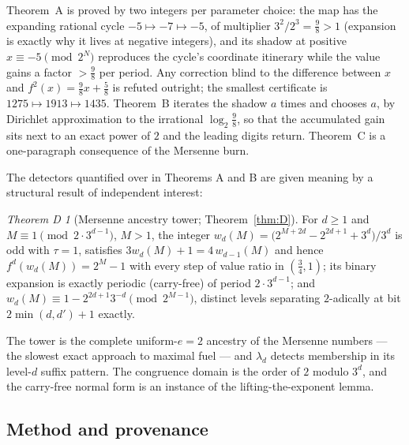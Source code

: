 \documentclass[11pt]{article}
\theoremstyle{definition}
\theoremstyle{remark}
\newtheorem*{thmD}{Theorem D}
\begin{document}
Theorem~A is proved by two integers per parameter choice: the map has
the expanding rational cycle $-5\mapsto-7\mapsto-5$, of multiplier
$3^2/2^3=\tfrac98>1$ (expansion is exactly why it lives at negative
integers), and its shadow at positive $x\equiv-5\pmod{2^N}$ reproduces
the cycle's coordinate itinerary while the value gains a factor
$>\tfrac98$ per period. Any correction blind to the difference between
$x$ and $f^2(x)=\tfrac98x+\tfrac58$ is refuted outright; the smallest
certificate is $1275\mapsto1913\mapsto1435$. Theorem~B iterates the
shadow $a$ times and chooses $a$, by Dirichlet approximation to the
irrational $\log_2\tfrac98$, so that the accumulated gain sits next to
an exact power of $2$ and the leading digits return. Theorem~C is a
one-paragraph consequence of the Mersenne burn.

The detectors quantified over in Theorems A and B are given meaning by
a structural result of independent interest:

\begin{thmD}[Mersenne ancestry tower; Theorem~\ref{thm:D}]
For $d\ge1$ and $M\equiv1\pmod{2\cdot3^{d-1}}$, $M>1$, the integer
$w_d(M)=\bigl(2^{M+2d}-2^{2d+1}+3^{d}\bigr)/3^{d}$ is odd with
$\tau=1$, satisfies $3w_d(M)+1=4\,w_{d-1}(M)$ and hence
$f^{d}(w_d(M))=2^{M}-1$ with every step of value ratio in
$(\tfrac34,1)$; its binary expansion is exactly periodic (carry-free)
of period $2\cdot3^{d-1}$; and $w_d(M)\equiv1-2^{2d+1}3^{-d}
\pmod{2^{M-1}}$, distinct levels separating $2$-adically at bit
$2\min(d,d')+1$ exactly.
\end{thmD}

The tower is the complete uniform-$e{=}2$ ancestry of the Mersenne
numbers --- the slowest exact approach to maximal fuel --- and
$\lambda_d$ detects membership in its level-$d$ suffix pattern. The
congruence domain is the order of $2$ modulo $3^d$, and the carry-free
normal form is an instance of the lifting-the-exponent lemma.

\subsection*{Method and provenance}
\end{document}
